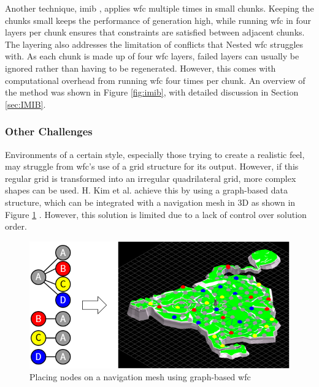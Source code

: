 Another technique, \acrlong{imib} \cite{Infinite_Modifying_In_Blocks}, applies \acrshort{wfc} multiple times in small chunks. Keeping the chunks small keeps the performance of generation high, while running \acrshort{wfc} in four layers per chunk ensures that constraints are satisfied between adjacent chunks. The layering also addresses the limitation of conflicts that Nested \acrshort{wfc} struggles with. As each chunk is made up of four \acrshort{wfc} layers, failed layers can usually be ignored rather than having to be regenerated. However, this comes with computational overhead from running \acrshort{wfc} four times per chunk. An overview of the method was shown in Figure \ref{fig:imib}, with detailed discussion in Section \ref{sec:IMIB}.

\subsubsection{Other Challenges}
Environments of a certain style, especially those trying to create a realistic feel, may struggle from \acrshort{wfc}'s use of a grid structure for its output. However, if this regular grid is transformed into an irregular quadrilateral grid, more complex shapes can be used. H. Kim et al. achieve this by using a graph-based data structure, which can be integrated with a navigation mesh in 3D as shown in Figure \ref{fig:navigationMeshNodePlacement} \cite{WFC_Graph-based}. However, this solution is limited due to a lack of control over solution order.

\begin{figure}[H]
    \centering
    \includegraphics[width=\textwidth, height=0.3\textheight, keepaspectratio]{Images/NavigationMeshNodePlacement.png}
    \caption{Placing nodes on a navigation mesh using graph-based \acrshort{wfc} \cite{WFC_Graph-based}}
    \label{fig:navigationMeshNodePlacement}
\end{figure}

